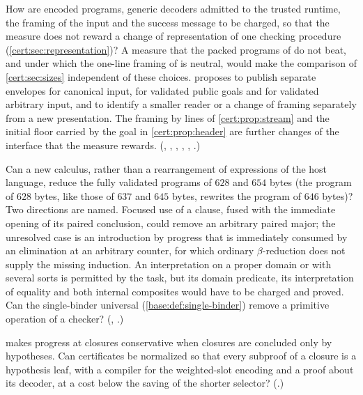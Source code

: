 \begin{question}
How are encoded programs, generic decoders admitted to the trusted runtime,
the framing of the input and the success message to be charged, so that the
measure does not reward a change of representation of one checking procedure
(\cref{cert:sec:representation})? A measure that the packed programs of
 do not beat, and under which the one-line framing of
 is neutral, would make the comparison of
\cref{cert:sec:sizes} independent of these choices. 
proposes to publish separate envelopes for canonical input, for validated
public goals and for validated arbitrary input, and to identify a smaller
reader or a change of framing separately from a new presentation. The framing
by lines of \cref{cert:prop:stream} and the initial floor carried by the goal
in \cref{cert:prop:header} are further changes of the interface that the
measure rewards. (, ,
, , ,
.)
\end{question}

\begin{question}
Can a new calculus, rather than a rearrangement of expressions of the host
language, reduce the fully validated programs of $628$ and $654$ bytes (the
program of $628$ bytes, like those of $637$ and $645$ bytes, rewrites the
program of $646$ bytes)? Two
directions are named. Focused use of a clause, fused with the immediate
opening of its paired conclusion, could remove an arbitrary paired major; the
unresolved case is an introduction by progress that is immediately consumed
by an elimination at an arbitrary counter, for which ordinary
$\beta$-reduction does not supply the missing induction. An interpretation
on a proper domain or with several sorts is permitted by the task, but its
domain predicate, its interpretation of equality and both internal composites
would have to be charged and proved. Can the single-binder universal
(\cref{base:def:single-binder}) remove a primitive operation of a checker?
(, .)
\end{question}

\begin{question}
 makes progress at closures conservative when
closures are concluded only by hypotheses. Can certificates be normalized so
that every subproof of a closure is a hypothesis leaf, with a compiler for the
weighted-slot encoding and a proof about its decoder, at a cost below the
saving of the shorter selector? (.)
\end{question}

